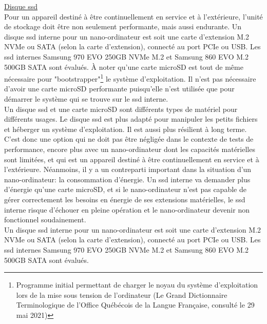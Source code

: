 \par\underline{Disque \acrshort{ssd}}
\vspace{0.5\baselineskip}
\\
\noindent Pour un appareil destiné à être continuellement en service et à l'extérieure, l'unité de stockage doit être non seulement performante, mais aussi endurante. Un disque \acrshort{ssd} interne pour un nano-ordinateur est soit une carte d'extension M.2 NVMe ou SATA (selon la carte d'extension), connecté au port PCIe ou USB. Les \acrshort{ssd} internes Samsung 970 EVO 250GB NVMe M.2 et Samsung 860 EVO M.2 500GB SATA sont évalués. À noter qu'une carte microSD est tout de même nécessaire pour "bootstrapper"\footnote{Programme initial permettant de charger le noyau du système d'exploitation lors de la mise sous tension de l'ordinateur (Le Grand Dictionnaire Terminologique de l'Office Québécois de la Langue Française, consulté le 29 mai 2021)} le système d'exploitation. Il n'est pas nécessaire d'avoir une carte microSD performante puisqu'elle n'est utilisée que pour démarrer le système qui se trouve sur le \acrshort{ssd} interne. 
\vspace{0.5\baselineskip}
\\
\noindent Un disque \acrshort{ssd} et une carte microSD sont différents types de matériel pour différents usages. Le disque \acrshort{ssd} est plus adapté pour manipuler les petits fichiers et héberger un système d'exploitation. Il est aussi plus résilient à long terme. C'est donc une option qui ne doit pas être négligée dans le contexte de tests de performance, encore plus avec un nano-ordinateur dont les capacités matérielles sont limitées, et qui est un appareil destiné à être continuellement en service et à l'extérieure. Néanmoins, il y a un contreparti important dans la situation d'un nano-ordinateur: la consommation d'énergie. Un \acrshort{ssd} interne va demander plus d'énergie qu'une carte microSD, et si le nano-ordinateur n'est pas capable de gérer correctement les besoins en énergie de ses extensions matérielles, le \acrshort{ssd} interne risque d'échouer en pleine opération et le nano-ordinateur devenir non fonctionnel soudainement.
\vspace{0.5\baselineskip}
\\
\noindent Un disque \acrshort{ssd} interne pour un nano-ordinateur est soit une carte d'extension M.2 NVMe ou SATA (selon la carte d'extension), connecté au port PCIe ou USB. Les \acrshort{ssd} internes Samsung 970 EVO 250GB NVMe M.2 et Samsung 860 EVO M.2 500GB SATA sont évalués.
